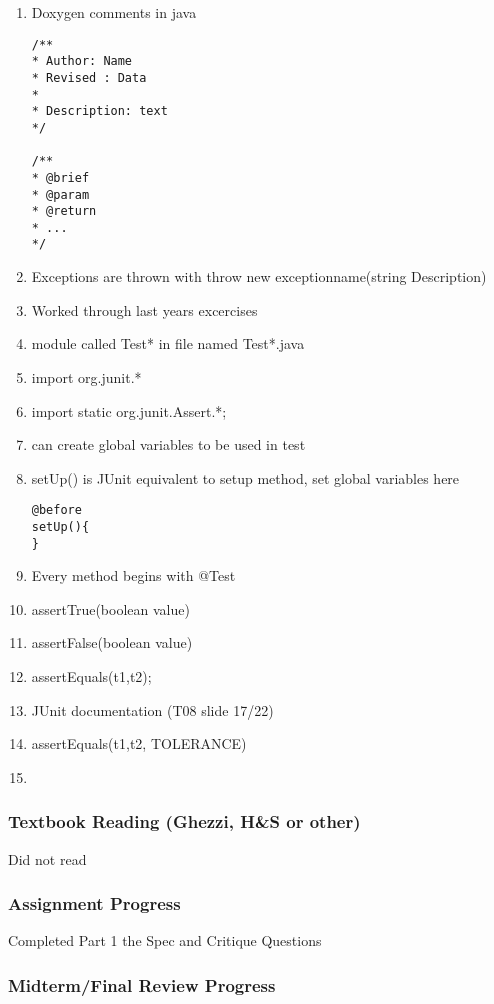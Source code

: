 \documentclass[12pt]{article}
\begin{document}
\begin{enumerate}
\item Doxygen comments in java \begin{verbatim}
/**
* Author: Name
* Revised : Data
* 
* Description: text
*/

/**
* @brief
* @param
* @return 
* ...
*/
\end{verbatim}

\item Exceptions are thrown with throw new exceptionname(string Description)
\item Worked through last years excercises

\item module called Test* in file named Test*.java
\item import org.junit.*
\item import static org.junit.Assert.*;
\item can create global variables to be used in test
\item setUp() is JUnit equivalent to setup method, set global variables here
\begin{verbatim}
@before
setUp(){
}
\end{verbatim}
\item Every method begins with @Test
\item assertTrue(boolean value)
\item assertFalse(boolean value)
\item assertEquals(t1,t2);
\item JUnit documentation (T08 slide 17/22)
\item assertEquals(t1,t2, TOLERANCE)
\item 

\end{enumerate}

\subsubsection *{Textbook Reading (Ghezzi, H\&S or other)}

Did not read

\subsubsection *{Assignment Progress}

Completed Part 1 the Spec and Critique Questions

\subsubsection *{Midterm/Final Review Progress}
\end{document}

